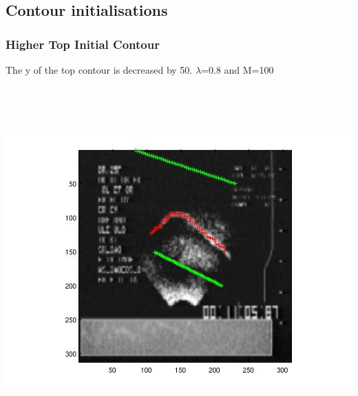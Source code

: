 \documentclass[12pt,a4paper,twocolumn]{article}
\begin{document}
\subsection{Contour initialisations}
\subsubsection{Higher Top Initial Contour}
The y of the top contour is decreased by 50.
$\lambda$=0.8 and M=100
\includegraphics[width=500pt,height=400pt,scale=1]{top_plus_many.jpg}
\newpage
\mbox{}
\newpage
\mbox{}
\end{document}
